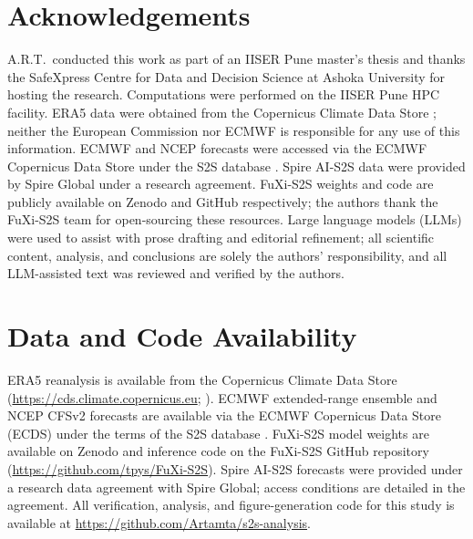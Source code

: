 \documentclass[11pt,a4paper]{article}
\begin{document}
\section*{Acknowledgements}

A.R.T.\ conducted this work as part of an IISER Pune master's thesis and
thanks the SafeXpress Centre for Data and Decision Science at Ashoka
University for hosting the research. Computations were performed on the
IISER Pune HPC facility. ERA5 data were obtained from the Copernicus
Climate Data Store \citep{hersbach2020}; neither the European Commission
nor ECMWF is responsible for any use of this information. ECMWF and NCEP
forecasts were accessed via the ECMWF Copernicus Data Store under the
S2S database \citep{vitart2017}. Spire AI-S2S data were provided by
Spire Global under a research agreement. FuXi-S2S weights and code are
publicly available on Zenodo and GitHub respectively; the authors thank
the FuXi-S2S team for open-sourcing these resources. Large language models (LLMs) were used to assist with prose drafting
and editorial refinement; all scientific content, analysis, and
conclusions are solely the authors' responsibility, and all
LLM-assisted text was reviewed and verified by the authors.

\section*{Data and Code Availability}

ERA5 reanalysis is available from the Copernicus Climate Data Store
(\url{https://cds.climate.copernicus.eu}; \citealt{hersbach2020}).
ECMWF extended-range ensemble and NCEP CFSv2 forecasts are available
via the ECMWF Copernicus Data Store (ECDS) under the terms of the S2S
database \citep{vitart2017}. FuXi-S2S model weights are available on
Zenodo and inference code on the FuXi-S2S GitHub repository
(\url{https://github.com/tpys/FuXi-S2S}). Spire AI-S2S forecasts were
provided under a research data agreement with Spire Global; access
conditions are detailed in the agreement. All verification, analysis, and figure-generation code for this study
is available at \url{https://github.com/Artamta/s2s-analysis}.
\end{document}
